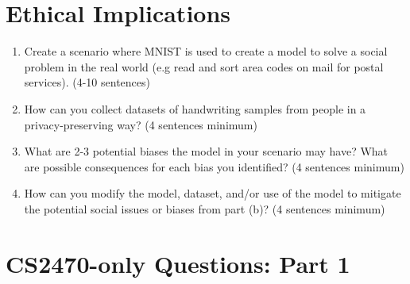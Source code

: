 \documentclass{article}
\begin{document}
\section{Ethical Implications}
\begin{enumerate}
\item Create a scenario where MNIST is used to create a model to solve a social problem in the real world (e.g read and sort area codes on mail for postal services). (4-10 sentences)

\item How can you collect datasets of handwriting samples from people in a privacy-preserving way? (4 sentences minimum)

\item What are 2-3 potential biases the model in your scenario may have? What are possible consequences for each bias you identified? (4 sentences minimum)

\item How can you modify the model, dataset, and/or use of the model to mitigate the potential social issues or biases from part (b)? (4 sentences minimum)
    
\end{enumerate}

\section{CS2470-only Questions: Part 1}
\end{document}

